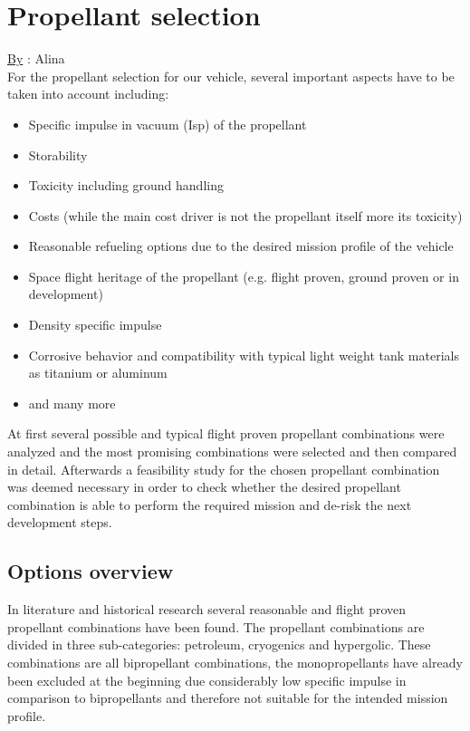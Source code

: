 \chapter{Propellant selection}
\qquad \underline{By} : Alina\\

For the propellant selection for our vehicle, several important aspects have to be taken into account including:
\begin{itemize}
	\item 	Specific impulse in vacuum (Isp) of the propellant
	\item	Storability
	\item	Toxicity including ground handling
	\item	Costs (while the main cost driver is not the propellant itself more its toxicity)
	\item	Reasonable refueling options due to the desired mission profile of the vehicle
	\item	Space flight heritage of the propellant (e.g. flight proven, ground proven or in development)
	\item	Density specific impulse
	\item	Corrosive behavior and compatibility with typical light weight tank materials as titanium or aluminum
	\item	and many more
\end{itemize}

At first several possible and typical flight proven propellant combinations were analyzed and the most promising combinations were selected and then compared in detail. Afterwards a feasibility study for the chosen propellant combination was deemed necessary in order to check whether the desired propellant combination is able to perform the required mission and de-risk the next development steps.

\section{Options overview}
\qquad In literature and historical research several reasonable and flight proven propellant combinations have been found. The propellant combinations are divided in three sub-categories: petroleum, cryogenics and hypergolic. These combinations are all bipropellant combinations, the monopropellants have already been excluded at the beginning due considerably low specific impulse in comparison to bipropellants and therefore not suitable for the intended mission profile.\\

